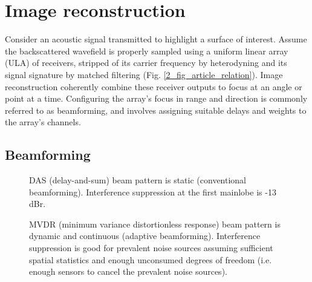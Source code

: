 {\section{Image reconstruction}\label{methods}

Consider an acoustic signal transmitted to highlight a surface of interest. Assume the backscattered wavefield is properly sampled using a uniform linear array (ULA) of receivers, stripped of its carrier frequency by heterodyning and its signal signature by matched filtering (Fig. \ref{2_fig_article_relation}). Image reconstruction coherently combine these receiver outputs to focus at an angle or point at a time. Configuring the array's focus in range and direction is commonly referred to as beamforming, and involves assigning suitable delays and weights to the array's channels.


\subsection{Beamforming}

\begin{figure}[tp]
\caption{DAS (delay-and-sum) beam pattern is static (conventional beamforming). Interference suppression at the first mainlobe is -13\,dBr.}%
\label{2_fig_scenario_das}
\end{figure}

\begin{figure}[tp]
\caption{MVDR (minimum variance distortionless response) beam pattern is dynamic and continuous (adaptive beamforming). Interference suppression is good for prevalent noise sources assuming sufficient spatial statistics and enough unconsumed degrees of freedom (i.e. enough sensors to cancel the prevalent noise sources).}%
\label{2_fig_scenario_mvdr}
\end{figure}

}
